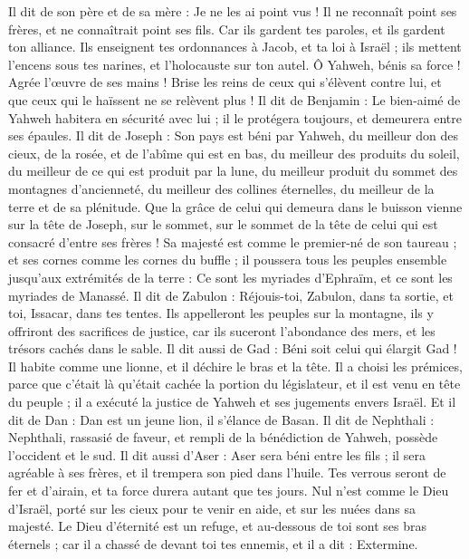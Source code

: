 \begin{multicols}{2}
Il dit de son père et de sa mère : Je ne les ai point vus ! Il ne reconnaît point ses frères, et ne connaîtrait point ses fils. Car ils gardent tes paroles, et ils gardent ton alliance.
Ils enseignent tes ordonnances à Jacob, et ta loi à Israël ; ils mettent l’encens sous tes narines, et l’holocauste sur ton autel.
Ô Yahweh, bénis sa force ! Agrée l'œuvre de ses mains ! Brise les reins de ceux qui s'élèvent contre lui, et que ceux qui le haïssent ne se relèvent plus !
Il dit de Benjamin : Le bien-aimé de Yahweh habitera en sécurité avec lui ; il le protégera toujours, et demeurera entre ses épaules.
Il dit de Joseph : Son pays est béni par Yahweh, du meilleur don des cieux, de la rosée, et de l'abîme qui est en bas,
du meilleur des produits du soleil, du meilleur de ce qui est produit par la lune,
du meilleur produit du sommet des montagnes d’ancienneté, du meilleur des collines éternelles,
du meilleur de la terre et de sa plénitude. Que la grâce de celui qui demeura dans le buisson vienne sur la tête de Joseph, sur le sommet, sur le sommet de la tête de celui qui est consacré d'entre ses frères !
Sa majesté est comme le premier-né de son taureau ; et ses cornes comme les cornes du buffle ; il poussera tous les peuples ensemble jusqu’aux extrémités de la terre : Ce sont les myriades d'Ephraïm, et ce sont les myriades de Manassé.
Il dit de Zabulon : Réjouis-toi, Zabulon, dans ta sortie, et toi, Issacar, dans tes tentes.
Ils appelleront les peuples sur la montagne, ils y offriront des sacrifices de justice, car ils suceront l'abondance des mers, et les trésors cachés dans le sable.
Il dit aussi de Gad : Béni soit celui qui élargit Gad ! Il habite comme une lionne, et il déchire le bras et la tête.
Il a choisi les prémices, parce que c'était là qu'était cachée la portion du législateur, et il est venu en tête du peuple ; il a exécuté la justice de Yahweh et ses jugements envers Israël.
Et il dit de Dan : Dan est un jeune lion, il s’élance de Basan.
Il dit de Nephthali : Nephthali, rassasié de faveur, et rempli de la bénédiction de Yahweh, possède l'occident et le sud.
Il dit aussi d'Aser : Aser sera béni entre les fils ; il sera agréable à ses frères, et il trempera son pied dans l'huile.
Tes verrous seront de fer et d'airain, et ta force durera autant que tes jours.
Nul n’est comme le Dieu d’Israël, porté sur les cieux pour te venir en aide, et sur les nuées dans sa majesté.
Le Dieu d’éternité est un refuge, et au-dessous de toi sont ses bras éternels ; car il a chassé de devant toi tes ennemis, et il a dit : Extermine.

\end{multicols}
